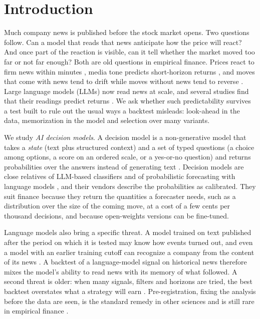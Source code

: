 \section{Introduction}\label{sec:intro}

Much company news is published before the stock market opens. Two questions follow. Can a model that reads that
news anticipate how the price will react? And once part of the reaction is visible, can it tell whether the
market moved too far or not far enough? Both are old questions in empirical finance. Prices react to firm news
within minutes \citep{patell1984,busse2002}, media tone predicts short-horizon returns \citep{tetlock2007}, and
moves that come with news tend to drift while moves without news tend to reverse \citep{chan2003}. Large
language models (LLMs) now read news at scale, and several studies find that their readings predict returns
\citep{lopezlira2026,chen2022}. We ask whether such predictability survives a test built to rule out the usual
ways a backtest misleads: look-ahead in the data, memorization in the model and selection over many variants.

We study \emph{AI decision models}. A decision model is a non-generative model that takes a \emph{state} (text
plus structured context) and a set of typed questions (a choice among options, a score on an ordered scale, or
a yes-or-no question) and returns probabilities over the answers instead of generating text
\citep{zhu2026}. Decision models are close relatives of LLM-based classifiers and of probabilistic
forecasting with language models \citep{kadavath2022,halawi2024,schoenegger2024}, and their vendors describe the
probabilities as calibrated. They suit finance because they return the quantities a forecaster needs, such as
a distribution over the size of the coming move, at a cost of a few cents per thousand decisions, and because
open-weights versions can be fine-tuned.

Language models also bring a specific threat. A model trained on text published after the period on which it
is tested may know how events turned out, and even a model with an earlier training cutoff can recognize a
company from the content of its news \citep{glasserman2024,sarkar2024,lopezlira2025}. A backtest of a
language-model signal on historical news therefore mixes the model's ability to read news with its memory of
what followed. A second threat is older: when many signals, filters and horizons are tried, the best backtest
overstates what a strategy will earn \citep{harvey2016,bailey2014}. Pre-registration, fixing the analysis before
the data are seen, is the standard remedy in other sciences and is still rare in empirical finance
\citep{harvey2017,olken2015}.


